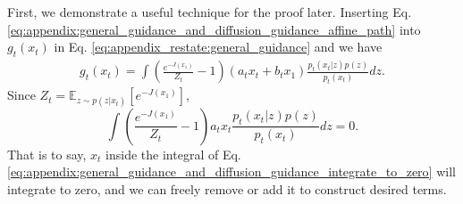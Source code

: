 First, we demonstrate a useful technique for the proof later.
Inserting Eq. \eqref{eq:appendix:general_guidance_and_diffusion_guidance_affine_path} into $g_t(x_t)$ in Eq. \eqref{eq:appendix_restate:general_guidance} and we have
\begin{align}\label{eq:appendix:general_guidance_expanded_v}
    g_t(x_t) = \int (\frac{e^{-J(x_1)}}{Z_t} - 1) (a_t x_t + b_t x_1) \frac{p_t(x_t|z)p(z)}{p_t(x_t)} dz.
\end{align}
Since $Z_t = \mathbb{E}_{z\sim p(z|x_t)}[e^{-J(x_1)}]$, 
\begin{equation}
    \int (\frac{e^{-J(x_1)}}{Z_t} - 1) a_t x_t \frac{p_t(x_t|z)p(z)}{p_t(x_t)} dz = 0.
    \label{eq:appendix:general_guidance_and_diffusion_guidance_integrate_to_zero}
\end{equation}
That is to say, $x_t$ inside the integral of Eq. \eqref{eq:appendix:general_guidance_and_diffusion_guidance_integrate_to_zero} will integrate to zero, and we can freely remove or add it to construct desired terms.

